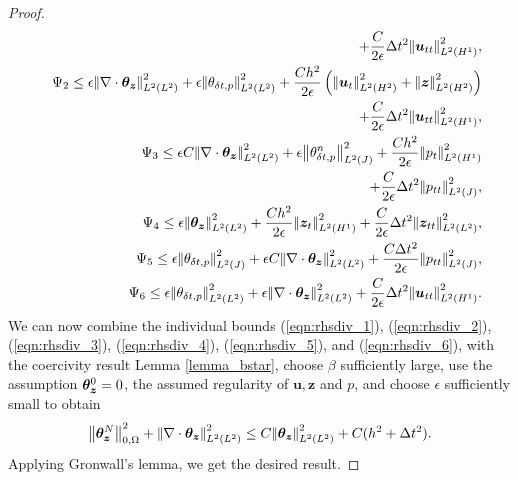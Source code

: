 \begin{proof}
\begin{eqnarray}
&& \qquad + \frac{C}{2\epsilon} \Delta t^{2} \honetimenorm{\dispcont_{tt}}^{2},
\label{eqn:rhsdiv_1} \\
&&\Psi_{2} \leq  \epsilon \ltwotimenorm{\nabla \cdot \auxflux }^{2} +{  \epsilon }\ltwotimenorm{\auxptime }^{2} + \frac{ Ch^2}{2\epsilon}  \left(  \htwotimenorm{\dispcont_t}^{2} +  \htwotimenorm{\fluxcont}^{2} \right) \nonumber \\
&& \qquad + \frac{C}{2\epsilon} \Delta t^{2} \honetimenorm{\dispcont_{tt}}^{2} ,
\label{eqn:rhsdiv_2} \\
&& \Psi_{3} \leq  {\epsilon C}\ltwotimenorm{\nabla \cdot \auxflux}^{2} + {\epsilon} \jtimenorm{\auxpntime }^{2}  +
 \frac{ Ch^2}{2\epsilon} \honetimenorm{\pcont_t}^{2} \\
&& \qquad+ \frac{C}{2\epsilon} \Delta t^{2} \jtimenorm{\pcont_{tt}}^{2},
\label{eqn:rhsdiv_3} \\
&&\Psi_{4} \leq   \epsilon \ltwotimenorm{\auxflux}^{2} +
 \frac{ Ch^2}{2\epsilon} \honetimenorm{\fluxcont_t}^{2} + \frac{C}{2\epsilon} \Delta t^{2} \ltwotimenorm{\fluxcont_{tt}}^{2},
\label{eqn:rhsdiv_4} \\
&& \Psi_{5} \leq \epsilon \jtimenorm{\auxptime}^{2} + { \epsilon C} \ltwotimenorm{\nabla \cdot \auxflux}^{2}+ \frac{ C \Delta t^{2} }{2\epsilon}   \jtimenorm{ \pcont_{tt} }^{2},
\label{eqn:rhsdiv_5} \\
&& \Psi_{6} \leq { \epsilon}\ltwotimenorm{\auxptime}^{2} +  \epsilon \ltwotimenorm{\nabla \cdot \auxflux}^{2}+ \frac{C}{2\epsilon} \Delta t^{2} \honetimenorm{\dispcont_{tt}}^{2}.
\label{eqn:rhsdiv_6}
\end{eqnarray}
We can now combine the individual bounds (\ref{eqn:rhsdiv_1}), (\ref{eqn:rhsdiv_2}), (\ref{eqn:rhsdiv_3}), (\ref{eqn:rhsdiv_4}), (\ref{eqn:rhsdiv_5}), and (\ref{eqn:rhsdiv_6}), with the coercivity result Lemma \ref{lemma_bstar}, choose $\beta$ sufficiently large, use the assumption $\boldsymbol{\theta}_{\boldsymbol{z}}^{0}=0$, the assumed regularity of ${\mathbf{u}}, {\mathbf{z}}$ and $p$, and choose $\epsilon$ sufficiently small to obtain
\begin{equation*}
{\left\vert\kern-0.25ex\left\vert \boldsymbol{\theta}_{\boldsymbol{z}}^{N} \right\vert\kern-0.25ex\right\vert}_{0,\Omega}^{2}   + {\left\vert\kern-0.25ex\left\vert \nabla \cdot \boldsymbol{\theta}_{\boldsymbol{z}} \right\vert\kern-0.25ex\right\vert}_{L^{2}(L^{2})}^{2}
 \leq
C {\left\vert\kern-0.25ex\left\vert \boldsymbol{\theta}_{\boldsymbol{z}} \right\vert\kern-0.25ex\right\vert}_{L^{2}(L^{2})}^{2}+ C(h^2 + \Delta t^2).
\end{equation*}
Applying Gronwall's lemma, we get the desired result.
\end{proof}





